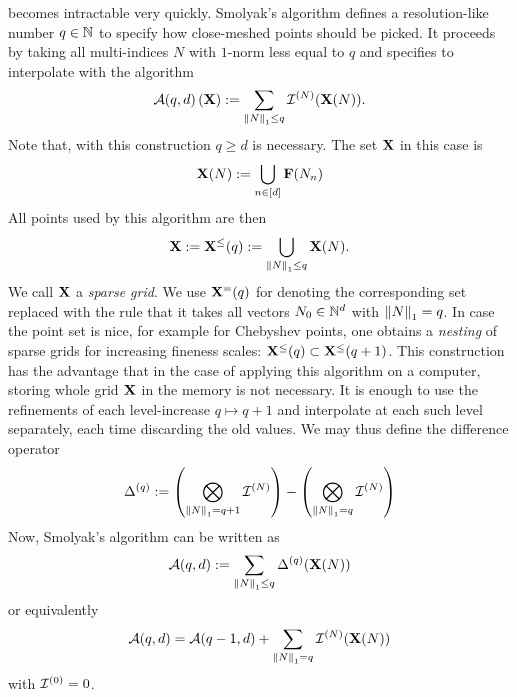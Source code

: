 \documentclass[12pt, oneside]{amsart}
\theoremstyle{definition}
\theoremstyle{remark}
\numberwithin{equation}{section}
\begin{document}
 becomes intractable very quickly. Smolyak's 
algorithm defines a resolution-like number \(q \in \N\) to specify how 
close-meshed points should be picked. It proceeds by taking all multi-indices 
\(N\) with \(1\)-norm less equal to \(q\) and specifies to interpolate 
with the algorithm %
\begin{equation}\label{eq:smolyak}
    \cA(q, d)\left(\XX\right) \defn \sum_{\norm[1]{N} \leq q} \cI^{(N)}(\XX(N)).
\end{equation}
Note that, with this construction \(q \geq d\) is necessary. The set \(\XX\) in 
this case is %
\begin{equation}\label{eq:indexGrid}
    \XX(N) \defn \bigcup_{n \in [d]} \FF(N_n)
\end{equation}
All points used by this algorithm are then
\begin{equation}\label{eq:sparseGrid}
    \XX \defn \XX^{\leq}(q) \defn \bigcup_{\norm[1]{N} \leq q} \XX(N).
\end{equation}
We call \(\XX\) a \emph{sparse grid}. We use \(\XX^{=}(q)\) for denoting the 
corresponding set replaced with the rule that it takes all vectors \(N_0\in\N^d 
\) with \(\norm[1]{N} = q\). In case the point set is nice, for example for 
Chebyshev points, one obtains a \emph{nesting} of sparse grids for increasing 
fineness scales: \(\XX^{\leq}(q) \subset \XX^{\leq}(q+1)\). This construction 
has the advantage that in the case of applying this algorithm on a computer, 
storing whole grid $\XX$ in the memory is not necessary. It is enough to use 
the refinements of each level-increase \(q \mapsto q+1\) and interpolate at 
each such level separately, each time discarding the 
old values. We may thus define the difference operator
\begin{equation}\label{eq:differenceOp}
    \Delta^{(q)} \defn \left( \bigotimes_{\norm[1]{N}=q+1} \cI^{(N)} \right) - \left( \bigotimes_{\norm[1]{N} = q} \cI^{(N)} \right)
\end{equation}
Now, Smolyak's algorithm can be written as
\begin{equation}\label{eq:SmolyakWithDifferences1}
    \cA(q, d) \defn \sum_{\norm[1]{N} \leq q} \Delta^{(q)}(\XX(N))
\end{equation}
or equivalently
\begin{equation}\label{eq:SmolyakWithDifferences2}
    \cA(q, d) = \cA(q-1, d) + \sum_{\norm[1]{N}=q} \cI^{(N)}(\XX(N))
\end{equation}
with \(\cI^{(0)} = 0\).
\end{document}
